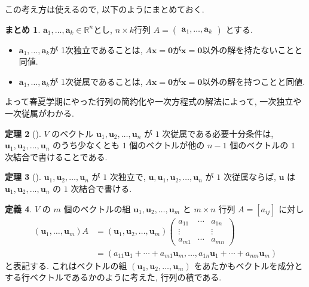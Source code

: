\documentclass[dvipdfmx,a4paper,11pt]{article} %
\theoremstyle{definition}
\newtheorem{thm}{定理}[section]
\newtheorem{defn}[thm]{定義}
\newtheorem{suma}[thm]{まとめ}
\begin{document}
この考え方は使えるので, 以下のようにまとめておく. 
\begin{suma}
\label{suma-linear-depend}
$\bm{a}_1, \ldots, \bm{a}_k \in \mathbb{R}^n$とし, $n \times k$行列
$A = 
\begin{pmatrix}
\bm{a}_1, \ldots, \bm{a}_k
\end{pmatrix}$ 
とする. 
\begin{itemize}
\item $\bm{a}_1, \ldots, \bm{a}_k$が 1次独立であることは, $A \bm{x} = \bm{0}$が$\bm{x}=\bm{0}$以外の解を持たないことと同値.
\item $\bm{a}_1, \ldots, \bm{a}_k$が 1次従属であることは, $A \bm{x} = \bm{0}$が$\bm{x}=\bm{0}$以外の解を持つことと同値.
\end{itemize}
\end{suma}
よって春夏学期にやった行列の簡約化や一次方程式の解法によって, 一次独立や一次従属がわかる. 


\begin{thm}[{\cite[定理4.2.1]{M}}] 
\(V\) のベクトル \(\bm{u}_1,\bm{u}_2,\ldots,\bm{u}_n\) が \(1\) 次従属である必要十分条件は, 
\(\bm{u}_1,\bm{u}_2,\ldots,\bm{u}_n\) のうち少なくとも \(1\) 個のベクトルが他の \(n-1\) 個のベクトルの \(1\) 次結合で書けることである.
\end{thm}

\begin{thm}[{\cite[定理4.2.2]{M}}] 
\(\bm{u}_1,\bm{u}_2,\ldots,\bm{u}_n\) が \(1\) 次独立で, \(\bm{u},\bm{u}_1,\bm{u}_2,\ldots,\bm{u}_n\) が \(1\) 次従属ならば, \(\bm{u}\) は \(\bm{u}_1,\bm{u}_2,\ldots,\bm{u}_n\) の \(1\) 次結合で書ける.
\end{thm}

\begin{defn} %
\(V\) の \(m\) 個のベクトルの組 \(\bm{u}_1,\bm{u}_2,\ldots,\bm{u}_m\) と \(m\times n\) 行列
\(
A=[a_{ij}]
\)
に対し
\[
\begin{aligned}
(\bm{u}_1,\ldots,\bm{u}_m)A
&=(\bm{u}_1,\bm{u}_2,\ldots,\bm{u}_m)
\begin{pmatrix}
a_{11}&\cdots&a_{1n}\\
\vdots&&\vdots\\
a_{m1}&\cdots&a_{mn}
\end{pmatrix}\\
&=(a_{11}\bm{u}_1+\cdots+a_{m1}\bm{u}_m,\ldots,
a_{1n}\bm{u}_1+\cdots+a_{mn}\bm{u}_m)
\end{aligned}
\]
と表記する. 
これはベクトルの組 \((\bm{u}_1,\bm{u}_2,\ldots,\bm{u}_m)\) をあたかもベクトルを成分とする行ベクトルであるかのように考えた, 行列の積である.
\end{defn}
\end{document}
